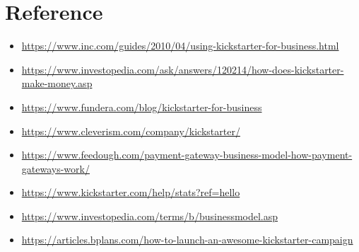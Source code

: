 \documentclass{report}
\begin{document}
\newpage

\chapter{Reference} \label{reference}
\begin{itemize}
\item \url{https://www.inc.com/guides/2010/04/using-kickstarter-for-business.html}
\item \url{https://www.investopedia.com/ask/answers/120214/how-does-kickstarter-make-money.asp}
\item \url{https://www.fundera.com/blog/kickstarter-for-business}
\item \url{https://www.cleverism.com/company/kickstarter/}
\item \url{https://www.feedough.com/payment-gateway-business-model-how-payment-gateways-work/}    
\item \url{https://www.kickstarter.com/help/stats?ref=hello}  
\item \url{https://www.investopedia.com/terms/b/businessmodel.asp}  
\item \url{https://articles.bplans.com/how-to-launch-an-awesome-kickstarter-campaign}  
\end{itemize}
 


%
%
\end{document}
